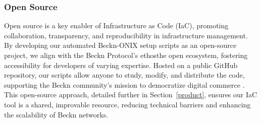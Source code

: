 \subsubsection{Open Source}
\label{open_source}
Open source is a key enabler of Infrastructure as Code (IaC), promoting collaboration, transparency, and reproducibility in infrastructure management. By developing our automated Beckn-ONIX setup scripts as an open-source project, we align with the Beckn Protocol’s ethosthe open ecosystem, fostering accessibility for developers of varying expertise. Hosted on a public GitHub repository, our scripts allow anyone to study, modify, and distribute the code, supporting the Beckn community’s mission to democratize digital commerce \citep{stallman1985gnu}. This open-source approach, detailed further in Section~\ref{product}, ensures our IaC tool is a shared, improvable resource, reducing technical barriers and enhancing the scalability of Beckn networks.